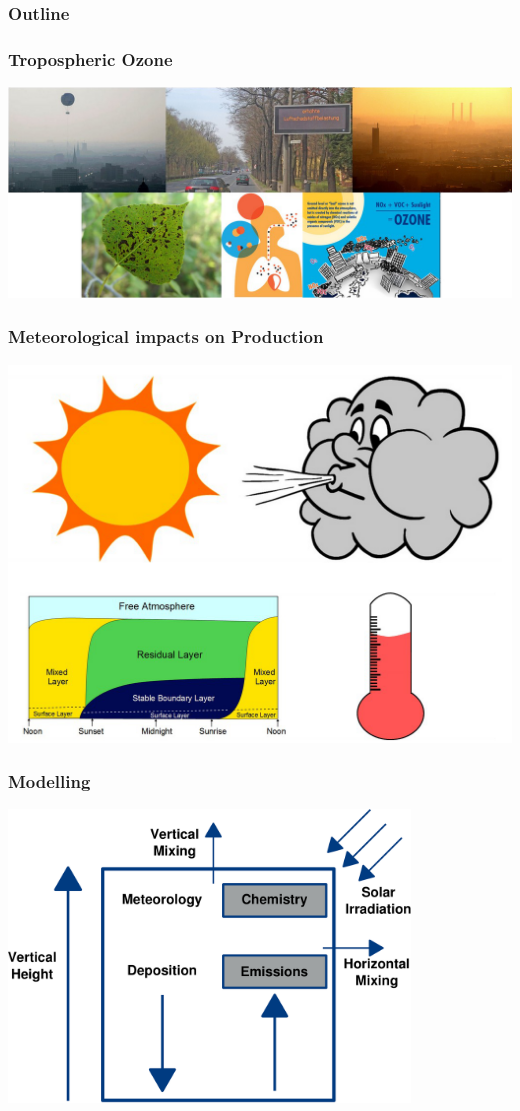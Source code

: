 \begin{frame}
    \frametitle{Outline} 
    \tableofcontents[currentsection]
\end{frame} 

\begin{frame}
    \frametitle{Tropospheric Ozone}
    \vspace{-0.5cm}
    \hspace*{-10.9mm}
    \includegraphics[width=\paperwidth]{../Pictures/intro_IQ} 
\end{frame} 

\begin{frame}
    \frametitle{Meteorological impacts on  Production}
    \vspace{-0.65cm}
    \begin{center}
        \includegraphics[scale=0.24]{../Pictures/Meteorology}
    \end{center} 
\end{frame}

\begin{frame}
    \frametitle{Modelling}
    \vspace{-0.6cm}
    \begin{center}
        \includegraphics[width=0.8\textwidth]{../Pictures/Model}
    \end{center} 
\end{frame}
